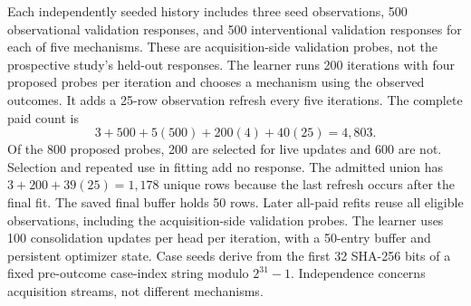 Each independently seeded history includes three seed observations,
500 observational validation responses, and 500 interventional validation
responses for each of five mechanisms. These are acquisition-side validation
probes, not the prospective study's held-out responses. The learner runs 200
iterations with four proposed probes per iteration and chooses a mechanism
using the observed outcomes. It adds a 25-row observation refresh every five
iterations. The complete paid count is
\[
 3+500+5(500)+200(4)+40(25)=4{,}803.
\]
Of the 800 proposed probes, 200 are selected for live updates and 600 are not.
Selection and repeated use in fitting add no response. The admitted union has
$3+200+39(25)=1{,}178$ unique rows because the last refresh occurs after the
final fit. The saved final buffer holds 50 rows. Later all-paid refits reuse
all eligible observations, including the acquisition-side validation probes.
The learner uses 100 consolidation updates per head per iteration, with a
50-entry buffer and persistent optimizer state.
Case seeds derive from the first 32 SHA-256 bits of a fixed pre-outcome
case-index string modulo $2^{31}-1$. Independence concerns acquisition streams,
not different mechanisms.

